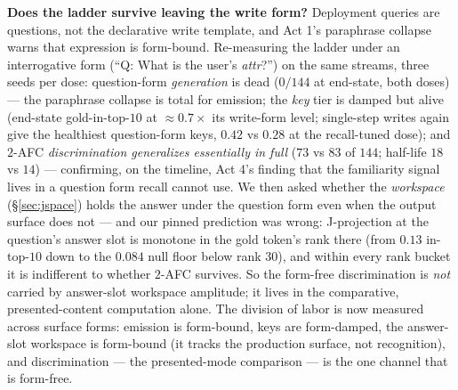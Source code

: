 \documentclass[11pt]{article}
\begin{document}
\textbf{Does the ladder survive leaving the write form?} Deployment queries are questions, not
the declarative write template, and Act 1's paraphrase collapse warns that expression is
form-bound. Re-measuring the ladder under an interrogative form (``Q: What is the user's
\emph{attr}?'') on the same streams, three seeds per dose: question-form \emph{generation} is
dead ($0/144$ at end-state, both doses) --- the paraphrase collapse is total for emission; the
\emph{key} tier is damped but alive (end-state gold-in-top-$10$ at $\approx 0.7\times$ its
write-form level; single-step writes again give the healthiest question-form keys, $0.42$ vs
$0.28$ at the recall-tuned dose); and $2$-AFC \emph{discrimination generalizes essentially in
full} ($73$ vs $83$ of $144$; half-life $18$ vs $14$) --- confirming, on the timeline, Act 4's
finding that the familiarity signal lives in a question form recall cannot use. We then asked
whether the \emph{workspace} (\S\ref{sec:jspace}) holds the answer under the question form even
when the output surface does not --- and our pinned prediction was wrong: J-projection at the
question's answer slot is monotone in the gold token's rank there (from $0.13$ in-top-$10$ down
to the $0.084$ null floor below rank $30$), and within every rank bucket it is indifferent to
whether $2$-AFC survives. So the form-free discrimination is \emph{not} carried by answer-slot
workspace amplitude; it lives in the comparative, presented-content computation alone. The
division of labor is now measured across surface forms: emission is form-bound, keys are
form-damped, the answer-slot workspace is form-bound (it tracks the production surface, not
recognition), and discrimination --- the presented-mode comparison --- is the one channel that
is form-free.
\end{document}
